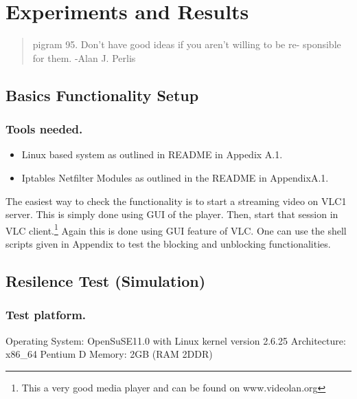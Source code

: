 \chapter{Experiments and Results}
\begin{quote}
pigram 95. Don't have good ideas if you aren't willing to be re-
sponsible for them.
-Alan J. Perlis
\end{quote}
\section{Basics Functionality Setup}
\subsection{Tools needed.}
\begin{itemize}
\item Linux based system as outlined in README in Appedix A.1.
\item Iptables Netfilter Modules as outlined in the README in AppendixA.1.
\end{itemize}
The easiest way to check the functionality is to start a streaming video on VLC1
server. This is simply done using GUI of the player. Then, start that session in
VLC client.\footnote{This a very good media player and can be found on www.videolan.org} Again this is done using GUI feature of VLC. One can use the shell
scripts given in Appendix to test the blocking and unblocking functionalities.
\section{Resilence Test (Simulation)}
\subsection{Test platform.}
Operating System: OpenSuSE11.0 with Linux kernel version 2.6.25
Architecture: x86\_64 Pentium D
Memory: 2GB (RAM 2DDR)
